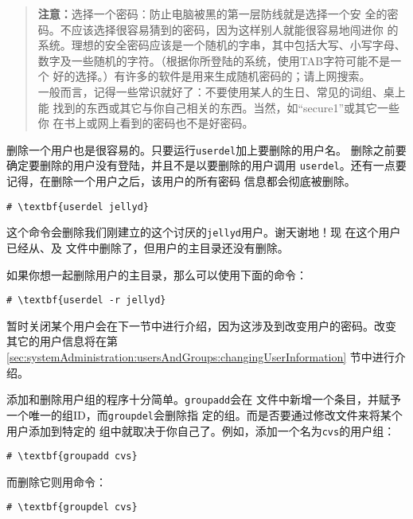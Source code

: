 \begin{quote}
  \textbf{注意：}选择一个密码：防止电脑被黑的第一层防线就是选择一个安
  全的密码。不应该选择很容易猜到的密码，因为这样别人就能很容易地闯进你
  的系统。理想的安全密码应该是一个随机的字串，其中包括大写、小写字母、
  数字及一些随机的字符。（根据你所登陆的系统，使用TAB字符可能不是一个
  好的选择。）有许多的软件是用来生成随机密码的；请上网搜索。\\
  一般而言，记得一些常识就好了：不要使用某人的生日、常见的词组、桌上能
  找到的东西或其它与你自己相关的东西。当然，如``secure1''或其它一些你
  在书上或网上看到的密码也不是好密码。
\end{quote}

删除一个用户也是很容易的。只要运行\texttt{userdel}加上要删除的用户名。
删除之前要确定要删除的用户没有登陆，并且不是以要删除的用户调用
\texttt{userdel}。还有一点要记得，在删除一个用户之后，该用户的所有密码
信息都会彻底被删除。

\begin{Verbatim}[frame=single, commandchars=\\\{\}]
# \textbf{userdel jellyd}
\end{Verbatim}
这个命令会删除我们刚建立的这个讨厌的\texttt{jellyd}用户。谢天谢地！现
在这个用户已经从、及
文件中删除了，但用户的主目录还没有删除。

如果你想一起删除用户的主目录，那么可以使用下面的命令：
\begin{Verbatim}[frame=single, commandchars=\\\{\}]
# \textbf{userdel -r jellyd}
\end{Verbatim}

暂时关闭某个用户会在下一节中进行介绍，因为这涉及到改变用户的密码。改变
其它的用户信息将在第
\ref{sec:systemAdministration:usersAndGroups:changingUserInformation}
节中进行介绍。

添加和删除用户组的程序十分简单。\texttt{groupadd}会在
文件中新增一个条目，并赋予一个唯一的组ID，而\texttt{groupdel}会删除指
定的组。而是否要通过修改文件来将某个用户添加到特定的
组中就取决于你自己了。例如，添加一个名为\texttt{cvs}的用户组：
\begin{Verbatim}[frame=single, commandchars=\\\{\}]
# \textbf{groupadd cvs}
\end{Verbatim}
而删除它则用命令：
\begin{Verbatim}[frame=single, commandchars=\\\{\}]
# \textbf{groupdel cvs}
\end{Verbatim}

